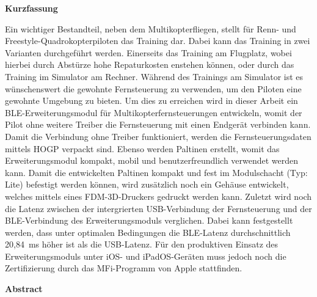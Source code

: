 
\pagestyle{empty}

\newenvironment{abstractpage}
  {\cleardoublepage\vspace*{\fill}\thispagestyle{empty}}
  {\vfill\cleardoublepage}
\newenvironment{abstractsection}[1]
  {\bigskip
   \begin{center}\bfseries#1\end{center}}
  {\par\bigskip}

\begin{abstractpage}
    \begin{abstractsection}{Kurzfassung}
      Ein wichtiger Bestandteil, neben dem Multikopterfliegen, stellt für Renn- und Freestyle-Quadrokopterpiloten das Training dar. Dabei kann das Training in zwei Varianten durchgeführt werden. Einerseits das Training am Flugplatz, wobei hierbei durch Abstürze hohe Repaturkosten enstehen können, oder durch das Training im Simulator am Rechner. Während des Trainings am Simulator ist es wünschenswert die gewohnte Fernsteuerung zu verwenden, um den Piloten eine gewohnte Umgebung zu bieten. Um dies zu erreichen wird in dieser Arbeit ein \acs{BLE}-Erweiterungsmodul für Multikopterfernsteuerungen entwickeln, womit der Pilot ohne weitere Treiber die Fernsteuerung mit einen Endgerät verbinden kann. Damit die Verbindung ohne Treiber funktioniert, werden die Fernsteuerungsdaten mittels \acs{HOGP} verpackt sind. Ebenso werden Paltinen erstellt, womit das Erweiterungsmodul kompakt, mobil und benutzerfreundlich verwendet werden kann. Damit die entwickelten Paltinen kompakt und fest im Modulschacht (Typ: Lite) befestigt werden können, wird zusätzlich noch ein Gehäuse entwickelt, welches mittels eines \acs{FDM}-3D-Druckers gedruckt werden kann. Zuletzt wird noch die Latenz zwischen der intergrierten USB-Verbindung der Fernsteuerung und der \acs{BLE}-Verbindung des Erweiterungsmoduls verglichen. Dabei kann festgestellt werden, dass unter optimalen Bedingungen die \acs{BLE}-Latenz durchschnittlich 20,84~ms höher ist als die USB-Latenz. Für den produktiven Einsatz des Erweiterungsmoduls unter iOS- und iPadOS-Geräten muss jedoch noch die Zertifizierung durch das \acs{MFi}-Programm von Apple stattfinden. 
    \end{abstractsection}

    \begin{abstractsection}{Abstract}
    \end{abstractsection}
\end{abstractpage}